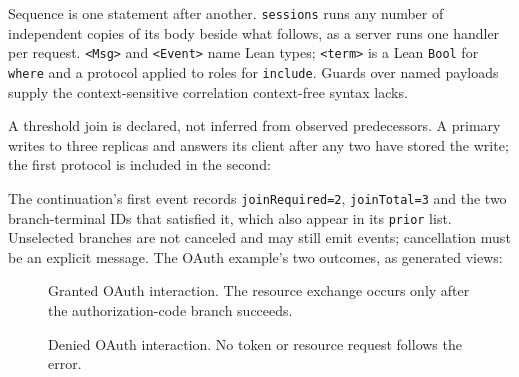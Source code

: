 Sequence is one statement after another. \texttt{sessions} runs any number of
independent copies of its body beside what follows, as a server runs one handler
per request. \texttt{<Msg>} and \texttt{<Event>} name Lean types; \texttt{<term>}
is a Lean \texttt{Bool} for \texttt{where} and a protocol applied to roles for
\texttt{include}. Guards over named payloads supply the context-sensitive
correlation context-free syntax lacks.

A threshold join is declared, not inferred from observed predecessors. A primary
writes to three replicas and answers its client after any two have stored the
write; the first protocol is included in the second:



The continuation's first event records \texttt{joinRequired=2},
\texttt{joinTotal=3} and the two branch-terminal IDs that satisfied it, which also
appear in its \texttt{prior} list. Unselected branches are not canceled and may
still emit events; cancellation must be an explicit message. The OAuth example's
two outcomes, as generated views:

\begin{figure}[htbp]
\centering
{}
\caption{Granted OAuth interaction. The resource exchange occurs only after the
authorization-code branch succeeds.}
\label{fig:oauth-grammar-granted}
\end{figure}

\begin{figure}[htbp]
\centering
{}
\caption{Denied OAuth interaction. No token or resource request follows the error.}
\label{fig:oauth-grammar-denied}
\end{figure}
\clearpage

